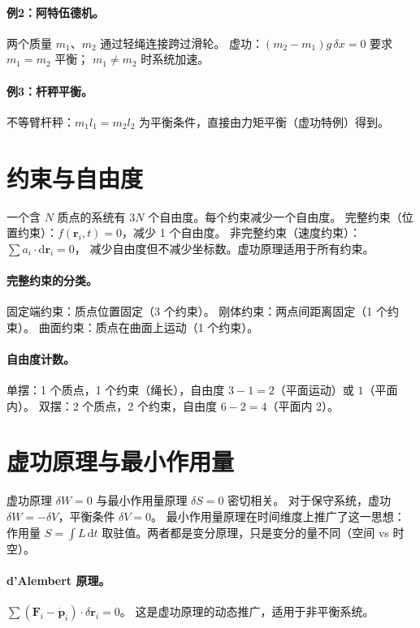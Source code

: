 \documentclass[UTF8,a4paper,11pt]{ctexart}
\begin{document}
\paragraph{例2：阿特伍德机。}
两个质量 $m_1$、$m_2$ 通过轻绳连接跨过滑轮。
虚功：$(m_2-m_1)g\,\delta x=0$ 要求 $m_1=m_2$ 平衡；
$m_1\ne m_2$ 时系统加速。

\paragraph{例3：杆秤平衡。}
不等臂杆秤：$m_1 l_1=m_2 l_2$ 为平衡条件，直接由力矩平衡（虚功特例）得到。

\section{约束与自由度}
\label{sec:constraints}

一个含 $N$ 质点的系统有 $3N$ 个自由度。每个约束减少一个自由度。
完整约束（位置约束）：$f(\boldsymbol r_i,t)=0$，减少 1 个自由度。
非完整约束（速度约束）：$\sum a_i\cdot\mathrm d\boldsymbol r_i=0$，
减少自由度但不减少坐标数。虚功原理适用于所有约束。

\paragraph{完整约束的分类。}
固定端约束：质点位置固定（3 个约束）。
刚体约束：两点间距离固定（1 个约束）。
曲面约束：质点在曲面上运动（1 个约束）。

\paragraph{自由度计数。}
单摆：1 个质点，1 个约束（绳长），自由度 $3-1=2$（平面运动）或 $1$（平面内）。
双摆：2 个质点，2 个约束，自由度 $6-2=4$（平面内 2）。

\section{虚功原理与最小作用量}
\label{sec:vw-action}

虚功原理 $\delta W=0$ 与最小作用量原理 $\delta S=0$ 密切相关。
对于保守系统，虚功 $\delta W=-\delta V$，平衡条件 $\delta V=0$。
最小作用量原理在时间维度上推广了这一思想：作用量 $S=\int L\,\mathrm dt$
取驻值。两者都是变分原理，只是变分的量不同（空间 vs 时空）。

\paragraph{d'Alembert 原理。}
$\sum(\boldsymbol F_i-\dot{\boldsymbol p}_i)\cdot\delta\boldsymbol r_i=0$。
这是虚功原理的动态推广，适用于非平衡系统。
\end{document}
